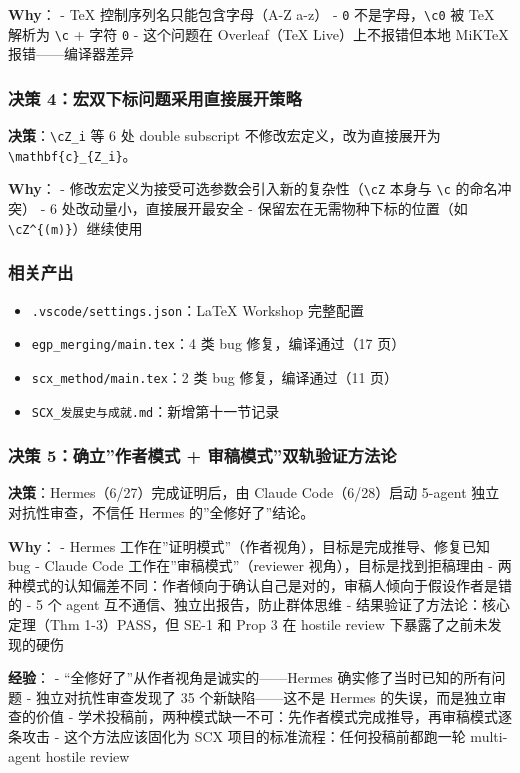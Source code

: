 \documentclass[
  12pt,
]{ctexart}
\providecommand{\tightlist}{%
  \setlength{\itemsep}{0pt}\setlength{\parskip}{0pt}}
\begin{document}
\textbf{Why}： - TeX 控制序列名只能包含字母（A-Z a-z） - \texttt{0}
不是字母，\texttt{\textbackslash{}c0} 被 TeX 解析为
\texttt{\textbackslash{}c} + 字符 \texttt{0} - 这个问题在 Overleaf（TeX
Live）上不报错但本地 MiKTeX 报错------编译器差异

\subsubsection{决策
4：宏双下标问题采用直接展开策略}\label{ux51b3ux7b56-4ux5b8fux53ccux4e0bux6807ux95eeux9898ux91c7ux7528ux76f4ux63a5ux5c55ux5f00ux7b56ux7565}

\textbf{决策}：\texttt{\textbackslash{}cZ\_i} 等 6 处 double subscript
不修改宏定义，改为直接展开为
\texttt{\textbackslash{}mathbf\{c\}\_\{Z\_i\}}。

\textbf{Why}： -
修改宏定义为接受可选参数会引入新的复杂性（\texttt{\textbackslash{}cZ}
本身与 \texttt{\textbackslash{}c} 的命名冲突） - 6
处改动量小，直接展开最安全 - 保留宏在无需物种下标的位置（如
\texttt{\textbackslash{}cZ\^{}\{(m)\}}）继续使用

\subsubsection{相关产出}\label{ux76f8ux5173ux4ea7ux51fa}

\begin{itemize}
\tightlist
\item
  \texttt{.vscode/settings.json}：LaTeX Workshop 完整配置
\item
  \texttt{egp\_merging/main.tex}：4 类 bug 修复，编译通过（17 页）
\item
  \texttt{scx\_method/main.tex}：2 类 bug 修复，编译通过（11 页）
\item
  \texttt{SCX\_发展史与成就.md}：新增第十一节记录
\end{itemize}

\subsubsection{决策 5：确立''作者模式 +
审稿模式''双轨验证方法论}\label{ux51b3ux7b56-5ux786eux7acbux4f5cux8005ux6a21ux5f0f-ux5ba1ux7a3fux6a21ux5f0fux53ccux8f68ux9a8cux8bc1ux65b9ux6cd5ux8bba}

\textbf{决策}：Hermes（6/27）完成证明后，由 Claude Code（6/28）启动
5-agent 独立对抗性审查，不信任 Hermes 的''全修好了''结论。

\textbf{Why}： - Hermes
工作在''证明模式''（作者视角），目标是完成推导、修复已知 bug - Claude
Code 工作在''审稿模式''（reviewer 视角），目标是找到拒稿理由 -
两种模式的认知偏差不同：作者倾向于确认自己是对的，审稿人倾向于假设作者是错的
- 5 个 agent 互不通信、独立出报告，防止群体思维 -
结果验证了方法论：核心定理（Thm 1-3）PASS，但 SE-1 和 Prop 3 在 hostile
review 下暴露了之前未发现的硬伤

\textbf{经验}： - ``全修好了''从作者视角是诚实的------Hermes
确实修了当时已知的所有问题 - 独立对抗性审查发现了 35
个新缺陷------这不是 Hermes 的失误，而是独立审查的价值 -
学术投稿前，两种模式缺一不可：先作者模式完成推导，再审稿模式逐条攻击 -
这个方法应该固化为 SCX 项目的标准流程：任何投稿前都跑一轮 multi-agent
hostile review
\end{document}
